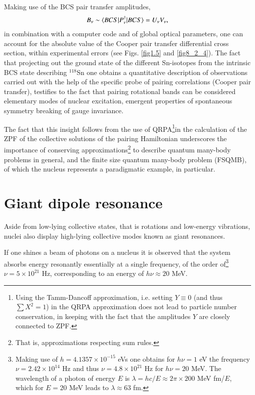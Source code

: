  Making use of the BCS pair transfer amplitudes,
\begin{align}\label{eq0.1.104}
B_\nu\sim\langle {BCS|P^\dagger_\nu|BCS} \rangle=U_\nu V_\nu,
\end{align}
in combination with a computer code and of global optical parameters, one can account for the  absolute value of the Cooper pair transfer differential cross section, within experimental errors (see Figs. \ref{fig1.5} and   \ref{fig8_2_4}). The fact that projecting out the ground state of the   different Sn-isotopes from the intrinsic BCS state describing $^{118}$Sn one obtains a quantitative description of observations carried out with the help of the specific probe of pairing correlations (Cooper pair transfer), testifies to the fact that pairing rotational bands can be considered elementary modes of nuclear excitation, emergent properties of spontaneous symmetry breaking of  gauge invariance. 

The fact that this insight follows from the use of QRPA\footnote{Using the Tamm-Dancoff approximation, i.e. setting $Y\equiv0$ (and thus $\sum X^2=1$) in the QRPA approximation does not lead to particle number conservation, in keeping with the fact that the amplitudes $Y$ are closely connected to ZPF.}in the calculation of the ZPF of the collective solutions of the pairing Hamiltonian underscores the importance of conserving approximations\footnote{That is, approximations respecting sum rules.} to describe quantum many-body problems in general, and the finite size quantum many-body problem (FSQMB), of which the nucleus represents a paradigmatic example, in particular. 

\section{Giant dipole resonance}\label{S1.5}
Aside from low-lying collective states, that is rotations and low-energy vibrations, nuclei also display high-lying collective modes known as giant resonances.


If one shines a beam of photons on a nucleus it is observed that the system 
absorbs energy resonantly essentially at a single frequency, of the order of\footnote{Making use of $h=4.1357\times10^{-15}$ eVs one obtains for $h\nu=1$ eV the frequency $\nu=2.42\times10^{14}$ Hz and thus $\nu=4.8\times10^{21}$ Hz for $h\nu=20$ MeV. The wavelength of a photon of energy $E$ is $\lambda=hc/E\approx2\pi\times200$ MeV fm/$E$, which for $E=20$ MeV leads to $\lambda\approx63$ fm.} $\nu=5\times10^{21}$ Hz, corresponding to an energy of $h\nu\approx20$ MeV.

